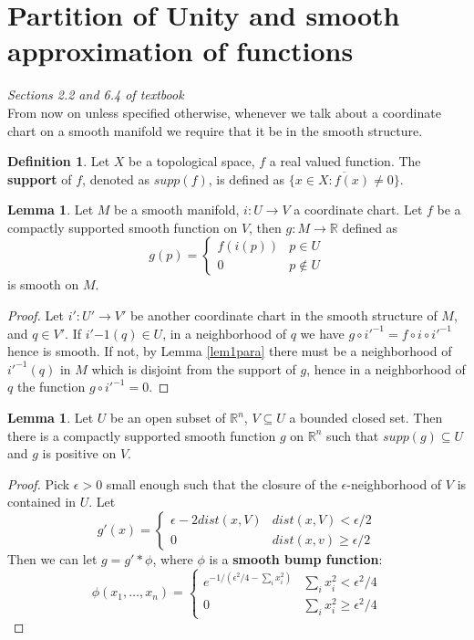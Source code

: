 \documentclass{article}
\theoremstyle{definition}
\newtheorem{lem}[thm]{Lemma}
\newtheorem{dfn}[thm]{Definition}
\begin{document}
\newpage

\section{Partition of Unity and smooth approximation of functions}

{\em Sections 2.2 and 6.4 of textbook}\\

From now on unless specified otherwise, whenever we talk about a coordinate chart on a smooth manifold we require that it be in the smooth structure.\\

\begin{dfn}
Let $X$ be a topological space, $f$ a real valued function. The {\bf support} of $f$, denoted as $supp(f)$, is defined as $\overline{\{x\in X: f(x)\not=0\}}$.
\end{dfn}

\begin{lem}\label{lem1pu}
Let $M$ be a smooth manifold, $i: U\rightarrow V$ a coordinate chart. Let $f$ be a compactly supported smooth function on $V$, then $g: M\rightarrow\mathbb{R}$ defined as 
\[g(p)=\begin{cases} f(i(p)) & p\in U\\ 0 & p\not\in U\end{cases}\]
is smooth on $M$.
\end{lem}

\begin{proof}
    Let $i': U'\rightarrow V'$ be another coordinate chart in the smooth structure of $M$, and $q\in V'$. If $i'{-1}(q)\in U$, in a neighborhood of $q$ we have $g\circ i'^{-1}=f\circ i\circ i'^{-1}$ hence is smooth. If not, by Lemma \ref{lem1para} there must be a neighborhood of $i'^{-1}(q)$ in $M$ which is disjoint from the support of $g$, hence in a neighborhood of $q$ the function $g\circ i'^{-1}=0$.
\end{proof}

\begin{lem}\label{lem2pu}
    Let $U$ be an open subset of $\mathbb{R}^n$, $V\subseteq U$ a bounded closed set. Then there is a compactly supported smooth function $g$ on $\mathbb{R}^n$ such that $supp(g)\subseteq U$ and $g$ is positive on $V$. 
\end{lem}

\begin{proof}
    Pick $\epsilon>0$ small enough such that the closure of the $\epsilon$-neighborhood of $V$ is contained in $U$. Let 
    \[g'(x)=\begin{cases}\epsilon-2dist(x, V) & dist(x, V)<\epsilon/2 \\ 0 & dist(x, v) \geq \epsilon/2\end{cases}\]
    Then we can let $g=g'*\phi$, where $\phi$ is a {\bf smooth bump function}:
    \[\phi(x_1, \dots, x_n)=\begin{cases}e^{-1/(\epsilon^2/4-\sum_i x_i^2)} & \sum_i x_i^2<\epsilon^2/4 \\ 0 & \sum_i x_i^2\geq \epsilon^2/4\end{cases}\]
\end{proof}
\end{document}
